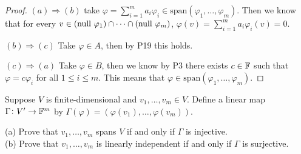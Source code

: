 \documentclass{extarticle}
\begin{document}
\begin{proof}
\((a) \Rightarrow (b)\) take \(\varphi = \sum_{i=1}^{m}a_i \varphi_i \in \text{span}(\varphi_1, \ldots, \varphi_m)\). 
Then we know that for every \(v \in (\text{null } \varphi_1) \cap \cdots \cap (\text{null } \varphi_m)\), 
\(\varphi(v) = \sum_{i=1}^{m}a_i \varphi_i(v) = 0\). 

\((b) \Rightarrow (c)\)  Take \(\varphi \in A\), then by P19 this holds. 

\((c) \Rightarrow (a)\) Take \(\varphi \in B\), then we know by P3 there exists \(c \in \mathbb{F}\)
such that \(\varphi = c \varphi_i\) for all \(1 \leq i \leq m\). This means that 
\(\varphi \in \text{span}(\varphi_1, \ldots, \varphi_m)\).
\end{proof}

\begin{problem}{24}
    Suppose \(V\) is finite-dimensional and \(v_1, \ldots, v_m \in V\). Define a linear map 
    \(\Gamma \colon V' \to \mathbb{F}^m\) by \(\Gamma(\varphi) = (\varphi(v_1), \ldots, 
    \varphi(v_m))\). 

    (a) Prove that \(v_1, \ldots, v_m\) spans \(V\) if and only if \(\Gamma\) is injective. \\ 
    (b) Prove that \(v_1, \ldots, v_m\) is linearly independent if and only if \(\Gamma\) is 
    surjective. 
\end{problem}
\end{document}
